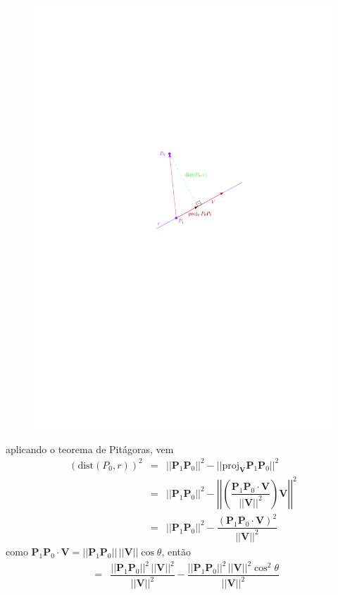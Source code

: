\documentclass[a4paper, 12pt, brazilian]{article}
\newcommand{\vect}{\bm{P}_{1}\bm{P}_{0}}
\begin{document}
	\begin{figure}[H]
		\centering
		\includegraphics[scale=1.1]{images/dist_n}
		\label{fig:distn}
	\end{figure}
	\noindent aplicando o teorema de Pitágoras, vem
	\begin{eqnarray}
		(\textrm{dist}(P_{0},r))^{2}&=&||\vect||^{2}-||\textrm{proj}_{\bm{V}}\vect||^{2}\\
		&=&||\vect||^{2}-\left|\!\left|\left(\dfrac{\vect\cdot\bm{V}}{||\bm{V}||^{2}}\right)\bm{V}\right|\!\right|^{2}\\
		&=&||\vect||^{2}-\dfrac{(\vect\cdot\bm{V})^{2}}{||\bm{V}||^{2}}
	\end{eqnarray}
	como $\vect\cdot\bm{V}=||\vect||\,||\bm{V}||\cos\theta$, então
	\begin{eqnarray}
		&=&\dfrac{||\vect||^{2}\,||\bm{V}||^{2}}{||\bm{V}||^{2}}-\dfrac{||\vect||^{2}\,||\bm{V}||^{2}\cos^{2}\theta}{||\bm{V}||^{2}}
	\end{eqnarray}
\end{document}
